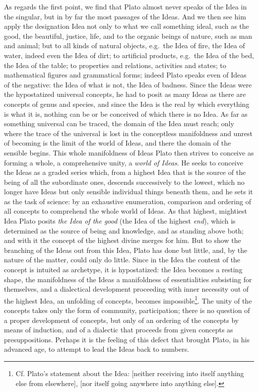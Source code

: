 As regards the first point, we find that Plato
almost never speaks of the Idea in the singular, but in by far the most
passages of the Ideas. And we then see him apply the designation Idea
not only to what we call something ideal, such as
the good, the beautiful, justice, life, and to the organic beings of nature, such as man and animal; but to all
kinds of natural objects, e.g.\ the Idea of fire, the Idea of water, indeed
even the Idea of dirt; to artificial products, e.g.\ the Idea of the bed, the Idea of the table; to properties and relations, activities and states; to mathematical figures and grammatical forms; indeed Plato speaks even of Ideas of the negative:
 \setcounter{footnote}{0}
the Idea of what is not, the Idea of badness. Since the
Ideas were the hypostatized universal concepts, he had to posit as many
Ideas as there are concepts of genus and species, and since the Idea is
the real by which everything is what it is, nothing
can be or be conceived of which there is no Idea. As far
as something universal can be traced, the domain of the Idea must reach;
only where the trace of the universal is lost in the conceptless
manifoldness and unrest of becoming is the limit of the world of Ideas, and there the domain of the sensible begins. This whole manifoldness of
Ideas Plato then strives to conceive as forming a whole,
a comprehensive unity, a \emph{world of Ideas}. He seeks to conceive
the Ideas as a graded series which, from a highest Idea that is
the source of the being of all the subordinate ones, descends successively
to the lowest, which no longer have Ideas but only sensible
individual things beneath them, and he sets it as the task of science:
by an exhaustive enumeration, comparison and
ordering of all concepts to comprehend the whole world of Ideas.
As that highest, mightiest Idea Plato posits \emph{the Idea of
the good} (the Idea of the highest \emph{end}), which is determined as the source
of being and knowledge, and as standing above both; and with it
the concept of the highest divine merges for him.
But to show the branching of the Ideas out from this Idea,
Plato has done but little, and, by the nature of the matter, could only
do little. Since in the Idea the content of the concept is intuited
as archetype, it is hypostatized: the Idea becomes a resting
shape, the manifoldness of the Ideas a manifoldness of essentialities subsisting
for themselves, and a dialectical development proceeding with inner necessity out of the highest Idea, an unfolding of concepts, becomes impossible\footnote{Cf. Plato's statement about the Idea:  [neither receiving into itself anything else from elsewhere],  [nor itself going anywhere into anything else].}. The unity of the concepts takes only
the form of community, participation; there is no question of a
proper development of concepts, but only of an ordering of the concepts by means of induction, and of a dialectic that proceeds
from given concepts as presuppositions. Perhaps it is
the feeling of this defect that brought Plato, in his advanced age, to attempt to lead the Ideas back to numbers.

